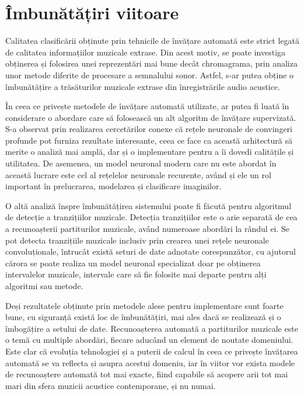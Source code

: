 \documentclass[a4paper,12pt]{report}
\begin{document}
\section{Îmbunătățiri viitoare}
Calitatea clasificării obținute prin tehnicile de învățare 
automată este strict legată de calitatea 
informațiilor muzicale extrase. Din acest motiv, 
se poate investiga obținerea și 
folosirea unei reprezentări 
mai bune decât chromagrama, prin analiza unor 
metode diferite de procesare a semnalului sonor. Astfel, 
s-ar putea obține o îmbunătățire a trăsăturilor muzicale 
extrase din înregistrările audio acustice.

În ceea ce privește metodele de învățare 
automată utilizate, ar putea fi luată 
în considerare o abordare care să folosească 
un alt algoritm de învățare supervizată. 
S-a observat prin realizarea cercetărilor conexe 
că rețele neuronale de convingeri profunde 
pot furniza rezultate interesante, ceea ce
face ca această arhitectură să merite o analiză 
mai amplă, dar și o implementare pentru 
a îi dovedi calitățile și utilitatea. De asemenea, 
un model neuronal modern care nu este abordat în această 
lucrare este cel al rețelelor neuronale recurente, 
având și ele un rol important în prelucrarea,
modelarea și clasificare imaginilor. 

O altă analiză înspre îmbunătățirea 
sistemului poate fi făcută pentru 
algoritmul de detecție a tranzițiilor muzicale.
Detecția tranzițiilor este o arie separată 
de cea a recunoașterii partiturilor muzicale, 
având numeroase abordări la rândul ei.
Se pot detecta tranzițiile muzicale inclusiv 
prin crearea unei rețele neuronale convoluționale, 
întrucât există seturi de date adnotate corespunzător, 
cu ajutorul cărora se poate realiza un model neuronal 
specializat doar pe obținerea intervalelor muzicale,
intervale care să fie folosite mai departe 
pentru alți algoritmi sau metode. 

Deși rezultatele obținute prin metodele alese 
pentru implementare sunt foarte bune, cu siguranță există 
loc de îmbunătățiri, mai ales dacă se realizează și o 
îmbogățire a setului de date. Recunoașterea automată 
a partiturilor muzicale este o temă cu multiple abordări,
fiecare aducând un element de noutate domeniului.
Este clar că evoluția tehnologiei și a puterii 
de calcul în ceea ce privește învățarea automată 
se va reflecta și asupra acestui domeniu, 
iar în viitor vor exista modele de recunoaștere 
automată tot mai exacte, fiind capabile să acopere 
arii tot mai mari din sfera muzicii 
acustice contemporane, și nu numai.

\newpage
\printbibliography[title=Bibliografie]
\end{document}
